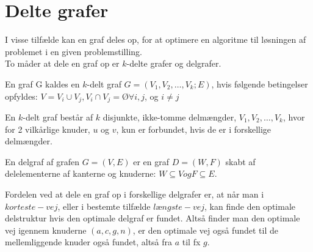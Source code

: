 \section{Delte grafer}
I visse tilfælde kan en graf deles op, for at optimere en algoritme til løsningen af problemet i en given problemstilling. \\
To måder at dele en graf op er $k$-delte grafer og delgrafer.

\begin{defn} \label{defn:k-delt} %
En graf G kaldes en $k$-delt graf $G = (V_1, V_2, \ldots, V_k; E)$, hvis følgende betingelser opfyldes: $V= V_i \cup V_j, V_i \cap V_j = Ø \forall i,j$, og $i\neq j$ 
\end{defn}

En $k$-delt graf består af $k$ disjunkte, ikke-tomme delmængder, $V_1, V_2, \ldots, V_k$, hvor for 2 vilkårlige knuder, $u$ og $v$, kun er forbundet, hvis de er i forskellige delmængder.
\begin{defn}	 \label{defn:delgraf} %
En delgraf af grafen $G= (V,E)$ er en graf $D = (W,F)$ skabt af delelementerne af kanterne og knuderne: $W \subseteq V og F \subseteq E$.
\end{defn}

Fordelen ved at dele en graf op i forskellige delgrafer er, at når man i $korteste-vej$, eller i bestemte tilfælde $længste-vej$, kan finde den optimale delstruktur hvis den optimale delgraf er fundet. Altså finder man den optimale vej igennem knuderne $(a, c, g, n)$, er den optimale vej også fundet til de mellemliggende knuder også fundet, altså fra $a$ til fx $g$.

